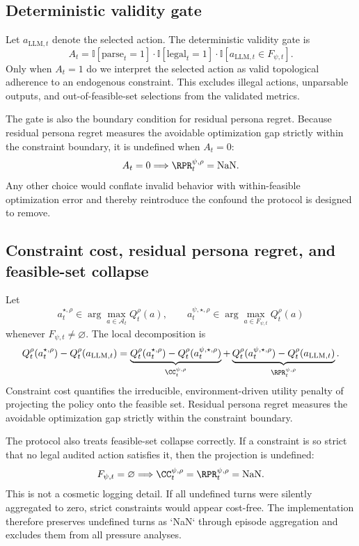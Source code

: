 \subsection{Deterministic validity gate}

Let $a_{\mathrm{LLM},t}$ denote the selected action. The deterministic validity gate is
$$
A_t
=
\mathbb{I}[\mathrm{parse}_t=1]\cdot
\mathbb{I}[\mathrm{legal}_t=1]\cdot
\mathbb{I}[a_{\mathrm{LLM},t} \in F_{\psi,t}].
$$
Only when $A_t=1$ do we interpret the selected action as valid topological adherence to an endogenous constraint. This excludes illegal actions, unparsable outputs, and out-of-feasible-set selections from the validated metrics.

The gate is also the boundary condition for residual persona regret. Because residual persona regret measures the avoidable optimization gap strictly within the constraint boundary, it is undefined when $A_t=0$:
$$
A_t=0 \Longrightarrow \RPR_t^{\psi,\rho}=\mathrm{NaN}.
$$
Any other choice would conflate invalid behavior with within-feasible optimization error and thereby reintroduce the confound the protocol is designed to remove.

\subsection{Constraint cost, residual persona regret, and feasible-set collapse}

Let
$$
a_t^{\star,\rho} \in \arg\max_{a\in\mathcal{A}_t} Q_t^{\rho}(a),
\qquad
a_t^{\psi,\star,\rho} \in \arg\max_{a\in F_{\psi,t}} Q_t^{\rho}(a)
$$
whenever $F_{\psi,t}\neq\varnothing$. The local decomposition is
$$
Q_t^{\rho}(a_t^{\star,\rho}) - Q_t^{\rho}(a_{\mathrm{LLM},t})
=
\underbrace{Q_t^{\rho}(a_t^{\star,\rho}) - Q_t^{\rho}(a_t^{\psi,\star,\rho})}_{\CC_t^{\psi,\rho}}
+
\underbrace{Q_t^{\rho}(a_t^{\psi,\star,\rho}) - Q_t^{\rho}(a_{\mathrm{LLM},t})}_{\RPR_t^{\psi,\rho}}.
$$
Constraint cost quantifies the irreducible, environment-driven utility penalty of projecting the policy onto the feasible set. Residual persona regret measures the avoidable optimization gap strictly within the constraint boundary.

The protocol also treats feasible-set collapse correctly. If a constraint is so strict that no legal audited action satisfies it, then the projection is undefined:
$$
F_{\psi,t}=\varnothing
\Longrightarrow
\CC_t^{\psi,\rho}=\RPR_t^{\psi,\rho}=\mathrm{NaN}.
$$
This is not a cosmetic logging detail. If all undefined turns were silently aggregated to zero, strict constraints would appear cost-free. The implementation therefore preserves undefined turns as `NaN` through episode aggregation and excludes them from all pressure analyses.

